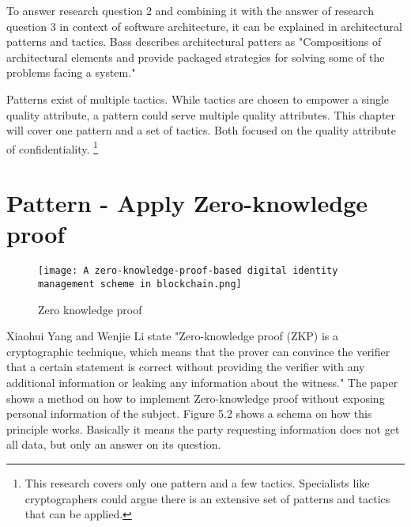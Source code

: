 
To answer research question 2 and combining it with the answer of research question 3 in context of software architecture, it can be explained in architectural patterns and tactics. Bass \etal \cite{Bass2015SoftwareAI} describes architectural patters as "Compositions of architectural elements and provide packaged strategies for solving some of the problems facing a system."

Patterns exist of multiple tactics. While tactics are chosen to empower a single quality attribute, a pattern could serve multiple quality attributes. This chapter will cover one pattern and a set of tactics. Both focused on the quality attribute of confidentiality.
\footnote{This research covers only one pattern and a few tactics. Specialists like cryptographers could argue there is an extensive set of patterns and tactics that can be applied.}

\section{Pattern - Apply Zero-knowledge proof}
\graphicspath{ {./images/} }
\begin{figure}[t]
\centering
\label{fig:ZKP}
\texttt{[image: A zero-knowledge-proof-based digital identity management scheme in blockchain.png]}\\
\caption{Zero knowledge proof}
\end{figure}

Xiaohui Yang and Wenjie Li\cite{YANG2020102050} state "Zero-knowledge proof (ZKP) is a cryptographic technique,
which means that the prover can convince the verifier that a certain statement is correct without providing the verifier with any additional information or leaking any information about the witness." The paper shows a method on how to implement Zero-knowledge proof without exposing personal information of the subject. Figure 5.2 shows a schema on how this principle works. Basically it means the party requesting information does not get all data, but only an answer on its question.

